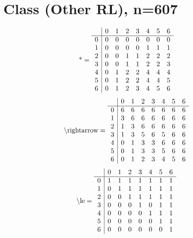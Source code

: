 \documentclass[11pt]{article}
\begin{document}
\section{Class (Other RL), n=607}
\[\text{*} = 
\begin{array}{r | r r r r r r r}
 & 0 & 1 & 2 & 3 & 4 & 5 & 6 \\ \hline
0 & 0 & 0 & 0 & 0 & 0 & 0 & 0 \\
1 & 0 & 0 & 0 & 0 & 1 & 1 & 1 \\
2 & 0 & 0 & 1 & 1 & 2 & 2 & 2 \\
3 & 0 & 0 & 1 & 1 & 2 & 2 & 3 \\
4 & 0 & 1 & 2 & 2 & 4 & 4 & 4 \\
5 & 0 & 1 & 2 & 2 & 4 & 4 & 5 \\
6 & 0 & 1 & 2 & 3 & 4 & 5 & 6 \\
\end{array}
\]
\[\text{\textbackslash rightarrow} = 
\begin{array}{r | r r r r r r r}
 & 0 & 1 & 2 & 3 & 4 & 5 & 6 \\ \hline
0 & 6 & 6 & 6 & 6 & 6 & 6 & 6 \\
1 & 3 & 6 & 6 & 6 & 6 & 6 & 6 \\
2 & 1 & 3 & 6 & 6 & 6 & 6 & 6 \\
3 & 1 & 3 & 5 & 6 & 5 & 6 & 6 \\
4 & 0 & 1 & 3 & 3 & 6 & 6 & 6 \\
5 & 0 & 1 & 3 & 3 & 5 & 6 & 6 \\
6 & 0 & 1 & 2 & 3 & 4 & 5 & 6 \\
\end{array}
\]
\[\text{\textbackslash le} = 
\begin{array}{r | r r r r r r r}
 & 0 & 1 & 2 & 3 & 4 & 5 & 6 \\ \hline
0 & 1 & 1 & 1 & 1 & 1 & 1 & 1 \\
1 & 0 & 1 & 1 & 1 & 1 & 1 & 1 \\
2 & 0 & 0 & 1 & 1 & 1 & 1 & 1 \\
3 & 0 & 0 & 0 & 1 & 0 & 1 & 1 \\
4 & 0 & 0 & 0 & 0 & 1 & 1 & 1 \\
5 & 0 & 0 & 0 & 0 & 0 & 1 & 1 \\
6 & 0 & 0 & 0 & 0 & 0 & 0 & 1 \\
\end{array}
\]
\end{document}

